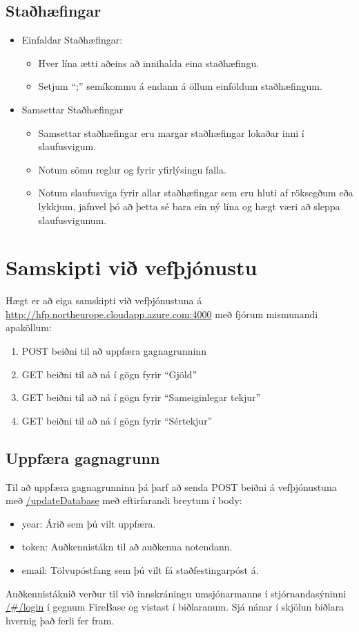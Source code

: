 \documentclass{article}
\theoremstyle{blueP}
\theoremstyle{greenS}
\begin{document}
\subsection{Staðhæfingar}
\begin{itemize}
    \item Einfaldar Staðhæfingar:
    \begin{itemize}
        \item Hver lína ætti aðeins að innihalda eina staðhæfingu.
        \item Setjum “;” semíkommu á endann á öllum einföldum staðhæfingum.
    \end{itemize}
    \item Samsettar Staðhæfingar
    \begin{itemize}
        \item Samsettar staðhæfingar eru margar staðhæfingar lokaðar inni í { } slaufusvigum.
        \item Notum sömu reglur og fyrir yfirlýsingu falla. 
        \item Notum slaufusviga fyrir allar staðhæfingar sem eru hluti af röksegðum eða lykkjum, jafnvel þó að þetta sé bara ein ný lína og hægt væri að sleppa slaufusvigunum. 
    \end{itemize}
\end{itemize}

\section{\Large Samskipti við vefþjónustu}
Hægt er að eiga samskipti við vefþjónustuna á \url{http://hfp.northeurope.cloudapp.azure.com:4000} með fjórum mismunandi apaköllum:
\begin{enumerate}
    \item POST beiðni til að uppfæra gagnagrunninn
    \item GET beiðni til að ná í gögn fyrir ``Gjöld''
    \item GET beiðni til að ná í gögn fyrir ``Sameiginlegar tekjur''
    \item GET beiðni til að ná í gögn fyrir ``Sértekjur''
\end{enumerate}

\subsection{Uppfæra gagnagrunn}
Til að uppfæra gagnagrunninn þá þarf að senda POST beiðni á vefþjónustuna með \url{/updateDatabase} með eftirfarandi breytum í body:
\begin{itemize}
    \item year: Árið sem þú vilt uppfæra.
    \item token: Auðkennistákn til að auðkenna notendann.
    \item email: Tölvupóstfang sem þú vilt fá staðfestingarpóst á.
\end{itemize}
Auðkennistáknið verður til við innskráningu umsjónarmanns í stjórnandasýninni \url{/\#/login} í gegnum FireBase og vistast í biðlaranum. Sjá nánar í skjölun biðlara hvernig það ferli fer fram.
\end{document}
